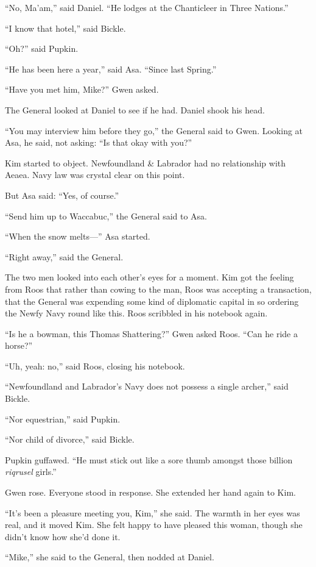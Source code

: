 \documentclass[11pt,a5paper]{article}
\begin{document}
 ``No, Ma'am,'' said Daniel. ``He lodges at the Chanticleer in Three Nations.''

 ``I know that hotel,'' said Bickle.

 ``Oh?'' said Pupkin.

 ``He has been here a year,'' said Asa. ``Since last Spring.''

 ``Have you met him, Mike?'' Gwen asked.

 The General looked at Daniel to see if he had. Daniel shook his head.

``You may interview him before they go,'' the General said to Gwen. Looking at Asa, he said, not asking: ``Is that okay with you?''

 Kim started to object. Newfoundland \& Labrador had no relationship with Aeaea. Navy law was crystal clear on this point.

But Asa said: ``Yes, of course.''

``Send him up to Waccabuc,'' the General said to Asa.

``When the snow melts---'' Asa started.

``Right away,'' said the General.

The two men looked into each other's eyes for a moment. Kim got the feeling from Roos that rather than cowing to the man, Roos was accepting a transaction, that the General was expending some kind of diplomatic capital in so ordering the Newfy Navy round like this. Roos scribbled in his notebook again.

``Is he a bowman, this Thomas Shattering?'' Gwen asked Roos. ``Can he ride a horse?''

``Uh, yeah: no,'' said Roos, closing his notebook.

``Newfoundland and Labrador's Navy does not possess a single archer,'' said Bickle.

``Nor equestrian,'' said Pupkin.

``Nor child of divorce,'' said Bickle.

Pupkin guffawed. ``He must stick out like a sore thumb amongst those billion \emph{riqrusel} girls.''

Gwen rose. Everyone stood in response. She extended her hand again to Kim.

``It's been a pleasure meeting you, Kim,'' she said. The warmth in her eyes was real, and it moved Kim. She felt happy to have pleased this woman, though she didn't know how she'd done it.

``Mike,'' she said to the General, then nodded at Daniel.
\end{document}

